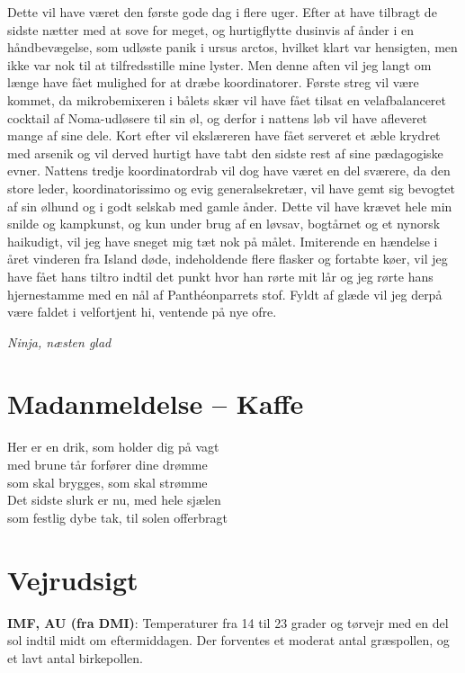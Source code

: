\begin{minipage}[b]{0.95\linewidth}
\begin{minipage}[t]{0.47\textwidth}
Dette vil have været den første gode dag i flere uger. Efter at have tilbragt de sidste nætter med at sove for meget, og hurtigflytte dusinvis af ånder i en håndbevægelse, som udløste panik i ursus arctos, hvilket klart var hensigten, men ikke var nok til at tilfredsstille mine lyster. Men denne aften vil jeg langt om længe have fået mulighed for at dræbe koordinatorer. Første streg vil være kommet, da mikrobemixeren i bålets skær vil have fået tilsat en velafbalanceret cocktail af Noma-udløsere til sin øl, og derfor i nattens løb vil have afleveret mange af sine dele. Kort efter vil ekslæreren have fået serveret et æble krydret med arsenik og vil derved hurtigt have tabt den sidste rest af sine pædagogiske evner. Nattens tredje koordinatordrab vil dog have været en del sværere, da den store leder, koordinatorissimo og evig generalsekretær, vil have gemt sig bevogtet af sin ølhund og i godt selskab med gamle ånder. Dette vil have krævet hele min snilde og kampkunst, og kun under brug af en løvsav, bogtårnet og et nynorsk haikudigt, vil jeg have sneget mig tæt nok på målet. Imiterende en hændelse i året vinderen fra Island døde, indeholdende flere flasker og fortabte køer, vil jeg have fået hans tiltro indtil det punkt hvor han rørte mit lår og jeg rørte hans hjernestamme med en nål af Panthéonparrets stof. Fyldt af glæde vil jeg derpå være faldet i velfortjent hi, ventende på nye ofre.

{\flushright\emph{Ninja, næsten glad}}

\vspace{-3mm}
\section*{Madanmeldelse -- Kaffe}

Her er en drik, som holder dig på vagt \\
med brune tår forfører dine drømme \\
som skal brygges, som skal strømme \\
Det sidste slurk er nu, med hele sjælen \\
som festlig dybe tak, til solen offerbragt

\end{minipage}%
\hfill\begin{minipage}[t]{0.47\textwidth}
\vspace{2mm}
\section*{Vejrudsigt}
\textbf{IMF, AU (fra DMI)}: Temperaturer fra 14 til 23 grader og tørvejr med en del sol indtil midt om eftermiddagen. Der forventes et moderat antal græspollen, og et lavt antal birkepollen.


\end{minipage}
\end{minipage}
